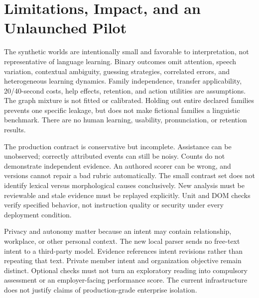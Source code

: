 \documentclass{article}
\begin{document}
\section{Limitations, Impact, and an Unlaunched Pilot}
\label{sec:limits}

The synthetic worlds are intentionally small and favorable to interpretation, not representative of language learning. Binary outcomes omit attention, speech variation, contextual ambiguity, guessing strategies, correlated errors, and heterogeneous learning dynamics. Family independence, transfer applicability, 20/40-second costs, help effects, retention, and action utilities are assumptions. The graph mixture is not fitted or calibrated. Holding out entire declared families prevents one specific leakage, but does not make fictional families a linguistic benchmark. There are no human learning, usability, pronunciation, or retention results.

The production contract is conservative but incomplete. Assistance can be unobserved; correctly attributed events can still be noisy. Counts do not demonstrate independent evidence. An authored scorer can be wrong, and versions cannot repair a bad rubric automatically. The small contrast set does not identify lexical versus morphological causes conclusively. New analysis must be reviewable and stale evidence must be replayed explicitly. Unit and DOM checks verify specified behavior, not instruction quality or security under every deployment condition.

Privacy and autonomy matter because an intent may contain relationship, workplace, or other personal context. The new local parser sends no free-text intent to a third-party model. Evidence references intent revisions rather than repeating that text. Private member intent and organization objective remain distinct. Optional checks must not turn an exploratory reading into compulsory assessment or an employer-facing performance score. The current infrastructure does not justify claims of production-grade enterprise isolation.
\end{document}
